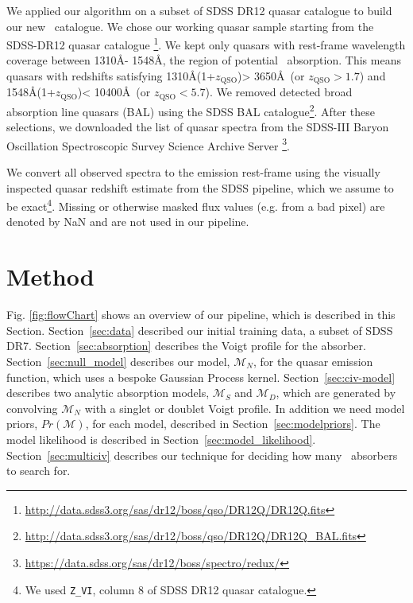 \documentclass[fleqn,usenatbib]{mnras}
\newcommand{\civ}{\ion{C}{IV}}
\newcommand{\zqso}{z_{\textrm{QSO}}}
\newcommand{\model}{\mathcal{M}}
\begin{document}
We applied our algorithm on a subset of SDSS DR12 quasar catalogue \citep{sdssdr12alam}
 to build our new \civ\ catalogue. We chose our working quasar sample starting from the
 SDSS-DR12 quasar catalogue
\footnote{\url{http://data.sdss3.org/sas/dr12/boss/qso/DR12Q/DR12Q.fits} }.
We kept only quasars with rest-frame wavelength coverage between 1310\AA - 1548\AA,
the region of potential \civ\ absorption.
This means quasars with redshifts satisfying 1310\AA(1+$\zqso$)> 3650\AA\ (or $\zqso>1.7$)
and 1548\AA(1+$\zqso$)< 10400\AA\ (or $\zqso<5.7$).
We removed detected broad absorption line quasars (BAL) using
the SDSS BAL
catalogue\footnote{\url{http://data.sdss3.org/sas/dr12/boss/qso/DR12Q/DR12Q_BAL.fits} }.
After these selections, we downloaded the list of
quasar spectra
from the SDSS-III Baryon Oscillation
Spectroscopic Survey Science Archive
Server
\footnote{\url{https://data.sdss.org/sas/dr12/boss/spectro/redux/} }.

We convert all observed spectra to
the emission rest-frame using the visually inspected quasar
redshift estimate from the SDSS
pipeline, which we assume to be exact\footnote{We used \texttt{Z\_VI}, column 8 of SDSS DR12
quasar catalogue.}.
Missing or otherwise masked flux values (e.g. from a bad pixel) are denoted by NaN and are not used in our pipeline.

\section{Method}
\label{sec:method}
Fig. \ref{fig:flowChart} shows an overview of our pipeline, which
is described in this Section. Section~\ref{sec:data} described our
initial training data, a subset of SDSS DR7. Section~\ref{sec:absorption}
describes the Voigt profile for the absorber. Section~\ref{sec:null_model}
describes our model,  $\model_N$, for the quasar emission function, which
uses a bespoke Gaussian Process kernel. Section~\ref{sec:civ-model}
describes two analytic absorption models, $\model_S$ and $\model_D$, which
are generated by convolving $\model_N$ with a singlet or
doublet Voigt profile. In addition we need model
priors, $Pr(\model)$, for each model, described in
Section~\ref{sec:modelpriors}. The model likelihood is
described in Section~\ref{sec:model_likelihood}.
Section~\ref{sec:multiciv} describes our technique for deciding how many \civ\ absorbers to search for.

\end{document}
